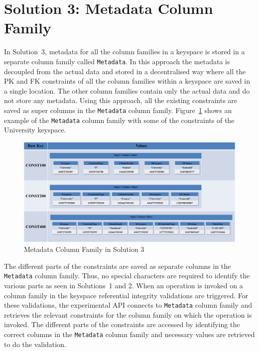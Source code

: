 \section{Solution 3:  Metadata Column Family} \label{s:design-sol3}

In Solution~3, metadata for all the column families in a keyspace is
stored in a separate column family called \texttt{Metadata}.   In this approach the metadata is
decoupled from the actual data and stored in a decentralised way where all the
\ac{PK} and \ac{FK} constraints of all the column families within a keyspace are
saved in a single location.  The other column families contain only the actual
data and do not store any metadata.  Using this approach,  all the
existing constraints are saved as super columns in
the \texttt{Metadata} column family. Figure~\ref{fd:Metadata-Solution3} shows
an example of the \texttt{Metadata} column family with some of the constraints
of the University keyspace.
 	\begin{landscape}
 	\begin{figure}[h] 
		\centering
		\includegraphics[width=1.5\textwidth]{./figure/Solutions/Sol3-MD-ColumnFamily.png}
		\caption{Metadata Column Family in Solution 3}\label{fd:Metadata-Solution3}
	\end{figure}
 	\end{landscape}
	

The different parts of the constraints are saved as separate columns in the
\texttt{Metadata} column family. Thus,  no special characters are required to
identify the various parts as seen in Solutions~1 and 2.  When an operation is
invoked on a column family in the keyspace referential integrity validations
are triggered.  For these validations,  the experimental \ac{API} connects to
\texttt{Metadata} column family and retrieves the relevant constraints for the column family on
which the operation is invoked. 
The different parts of the constraints are accessed by identifying the
correct columns in the \texttt{Metadata} column family and necessary values are
retrieved to do the validation. 

